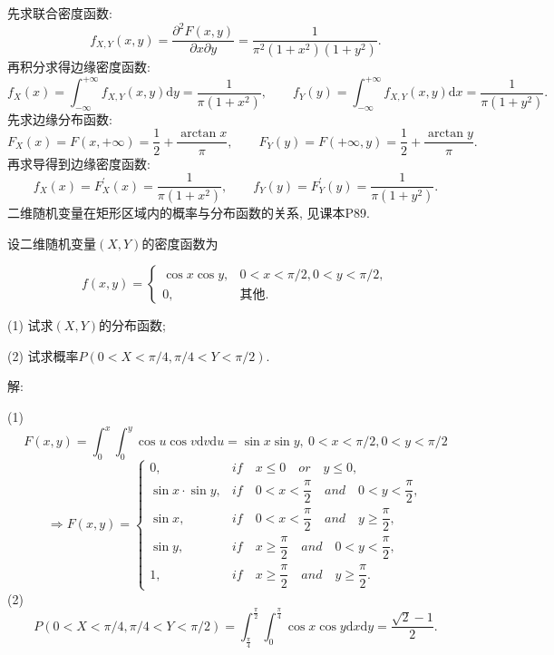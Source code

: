 \documentclass[standard]{ExBook}
\begin{document}
\begin{qitems}
\begin{bbox}
 先求联合密度函数:
$$f_{X,Y}(x,y)=\frac{\partial^{2}F(x,y)}{\partial x\partial y}=\frac{1}{\pi^2(1+x^2)(1+y^2)}.$$
再积分求得边缘密度函数:
$$f_{X}(x)=\displaystyle\int_{-\infty}^{+\infty}f_{X,Y}(x,y)\mathrm{d}y=\frac{1}{\pi(1+x^2)},\qquad f_{Y}(y)=\displaystyle\int_{-\infty}^{+\infty}f_{X,Y}(x,y)\mathrm{d}x=\frac{1}{\pi(1+y^2)}.$$
 先求边缘分布函数:
$$F_{X}(x)=F(x,+\infty)=\frac{1}{2}+\frac{\arctan x}{\pi},\qquad F_{Y}(y)=F(+\infty,y)=\frac{1}{2}+\frac{\arctan y}{\pi}.$$
再求导得到边缘密度函数:
$$f_{X}(x)=F_{X}^{'}(x)=\frac{1}{\pi(1+x^2)}, \qquad f_{Y}(y)=F_{Y}^{'}(y)=\frac{1}{\pi(1+y^2)}.$$
\textcolor{themeColor}{\selectfont {} 二维随机变量在矩形区域内的概率与分布函数的关系, 见课本P89.}
    \end{bbox}

\vspace{-5em}

    \begin{bbox}
    \begin{shaded}
        \qitem
设二维随机变量$(X,Y)$的密度函数为
\vspace{-2em}
\begin{center}
\begin{equation}
    f(x,y)=
    \left\{
    \begin{array}{cl}
        \nonumber
        \cos x\cos y, &0 < x < \pi/2, 0 < y < \pi/2,\\
        0, &\text{其他}.
    \end{array}
    \right.
\end{equation}
\end{center}
(1) 试求$(X,Y)$的分布函数;

(2) 试求概率$P(0<X<\pi/4,\pi/4<Y<\pi/2)$.
    \end{shaded}
    \end{bbox}

\vspace{-5em}

    \begin{bbox}
解: 

(1) $$F(x,y)=\displaystyle\int_{0}^{x}\int_{0}^{y}\cos u\cos v\mathrm{d}v\mathrm{d}u=\sin x\sin y,\ 0 < x < \pi/2, 0 < y < \pi/2$$
\[
\Longrightarrow
F(x,y) = 
\begin{cases}
0, & if\quad x \leq 0\quad or\quad y \leq 0, \\
\sin x \cdot \sin y, & if\quad 0 < x < \dfrac{\pi}{2}\quad and\quad 0 < y < \dfrac{\pi}{2}, \\
\sin x, & if\quad 0 < x < \dfrac{\pi}{2}\quad and\quad y \geq \dfrac{\pi}{2}, \\
\sin y, & if\quad x \geq \dfrac{\pi}{2}\quad and\quad 0 < y < \dfrac{\pi}{2}, \\
1, & if\quad x \geq \dfrac{\pi}{2}\quad and\quad y \geq \dfrac{\pi}{2}.
\end{cases}
\]
(2) $$P(0<X<\pi/4,\pi/4<Y<\pi/2)=\displaystyle\int_{\frac{\pi}{4}}^{\frac{\pi}{2}}\int_{0}^{\frac{\pi}{4}}\cos x\cos y\mathrm{d}x\mathrm{d}y=\displaystyle\frac{\sqrt{2}-1}{2}.$$
    \end{bbox}


\end{qitems}
\end{document}
